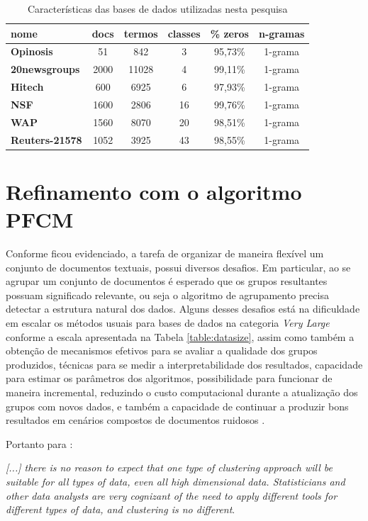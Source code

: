 \begin{table}[!htp]
  \centering
  \begin{tabular}{ |l|c c c c c|}
    \hline
    {\bf nome} & docs & termos & classes & \% zeros & n-gramas \\
    \hline
    {\bf Opinosis} & 51 & 842 & 3 & 95,73\% & 1-grama \\
    \hline
    {\bf 20newsgroups} & 2000 & 11028 & 4 & 99,11\% & 1-grama \\
    \hline
    {\bf Hitech} & 600 & 6925 & 6 & 97,93\% & 1-grama \\
    \hline
    {\bf NSF} & 1600 & 2806 & 16 & 99,76\% & 1-grama \\
    \hline
    {\bf WAP} & 1560 & 8070 & 20 & 98,51\% & 1-grama \\
    \hline
    {\bf Reuters-21578} & 1052 & 3925 & 43 & 98,55\% & 1-grama \\
    \hline
  \end{tabular}
  \caption{Características das bases de dados utilizadas nesta pesquisa}
  \label{table:datasets}
\end{table}

\section{Refinamento com o algoritmo PFCM}
\label{sec:exppfcm}

Conforme ficou evidenciado, a tarefa de organizar de maneira flexível um conjunto de documentos
textuais, possui diversos desafios. Em particular, ao se agrupar um conjunto de documentos é
esperado que os grupos resultantes possuam significado relevante, ou seja o algoritmo de
agrupamento precisa detectar a estrutura natural dos dados\cite{Steinbach2004}. Alguns desses 
desafios está na dificuldade em escalar os métodos usuais para bases de dados na categoria {\it Very Large}
conforme a escala apresentada na Tabela \ref{table:datasize}, assim como também a obtenção de
mecanismos efetivos para se avaliar a qualidade dos grupos produzidos, técnicas para se medir a
interpretabilidade dos resultados, capacidade para estimar os parâmetros dos algoritmos,
possibilidade para funcionar de maneira incremental, reduzindo o custo computacional durante a
atualização dos grupos com novos dados, e também a capacidade de continuar a produzir bons
resultados em cenários compostos de documentos ruidosos \cite{Carvalho2016}. 

Portanto para :
\begin{citacao}
  {\it [...] there is no reason to expect that one type of clustering approach will
  be suitable for all types of data, even all high dimensional data. Statisticians and other
  data analysts are very cognizant of the need to apply different tools for different types of
  data, and clustering is no different\/}.
\end{citacao}

